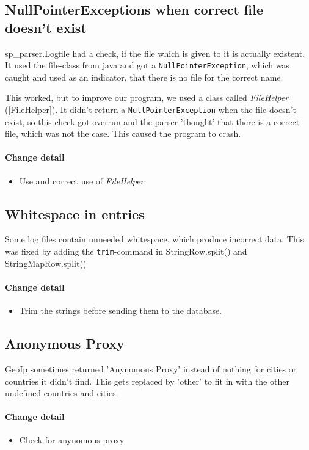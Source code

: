 \subsection{NullPointerExceptions when correct file doesn't exist}
sp\_parser.Logfile had a check, if the file which is given to it is actually existent. It used the file-class from java
and got a \texttt{NullPointerException}, which was caught and used as an indicator, that there is no file for the correct name.

This worked, but to improve our program, we used a class called \textit{FileHelper} (\ref{FileHelper}). 
It didn't return a \texttt{NullPointerException} when the file doesn't exist, 
so this check got overrun and the parser 'thought' that there is a correct file, which was not the case.
This caused the program to crash. 

\paragraph{Change detail}
\begin{itemize}
  \item Use and correct use of \textit{FileHelper}
\end{itemize}

\subsection{Whitespace in entries}
Some log files contain unneeded whitespace, which produce incorrect data. 
This was fixed by adding the \texttt{trim}-command in StringRow.split() and StringMapRow.split()

\paragraph{Change detail}
\begin{itemize}
  \item Trim the strings before sending them to the database.
\end{itemize}

\subsection{Anonymous Proxy}
GeoIp sometimes returned 'Anynomous Proxy' instead of nothing for cities or countries it didn't find.
This gets replaced by 'other' to fit in with the other undefined countries and cities.


\paragraph{Change detail}
\begin{itemize}
  \item Check for anynomous proxy
\end{itemize}

